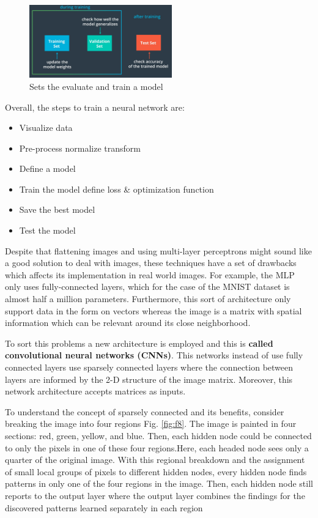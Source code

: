 \documentclass{article}
\begin{document}
\begin{figure}[ht]
    \centering
    \includegraphics[width=0.55\textwidth,height=0.55\textheight,keepaspectratio]{images/sets.png}
    \captionsetup{justification=centering}
    \caption{Sets the evaluate and train a model}
    \label{fig:f7}
\end{figure}

Overall, the steps to train a neural network are:

\begin{itemize}
  \item Visualize data
  \item Pre-process normalize transform
  \item Define a model
  \item Train the model define loss \& optimization function
  \item Save the best model
  \item Test the model
\end{itemize}

Despite that flattening images and using multi-layer perceptrons might sound like a good solution to deal with images, these techniques have a set of drawbacks which affects its implementation in real world images. For example, the MLP only uses fully-connected layers, which for the case of the MNIST dataset is almost half a million parameters. Furthermore, this sort of architecture only support data in the form on vectors whereas the image is a matrix with spatial information which can be relevant around its close neighborhood. 

To sort this problems a new architecture is employed and this is \textbf{called convolutional neural networks (CNNs)}. This networks instead of use fully connected layers use sparsely connected layers where the connection between layers are informed by the 2-D structure of the image matrix. Moreover, this network architecture accepts matrices as inputs. 

To understand the concept of sparsely connected and its benefits, consider breaking the image into four regions Fig. \ref{fig:f8}. The image is painted in four sections: red, green, yellow, and blue. Then, each hidden node could be connected to only the pixels in one of these four regions.Here, each headed node sees only a quarter of the original image. With this regional breakdown and the assignment of small local groups of pixels to different hidden nodes, every hidden node finds patterns in only one of the four regions in the image. Then, each hidden node still reports to the output layer where the output layer combines the findings for the discovered patterns learned separately in each region
\end{document}
